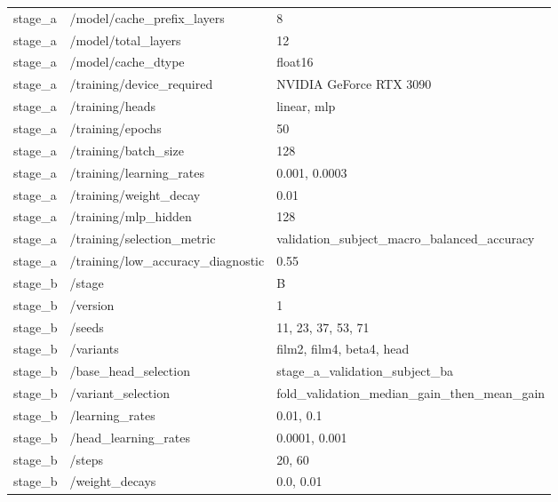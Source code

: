 \begin{longtable}{p{.65in}p{2.8in}p{3.2in}}
stage\_\allowbreak{}a & /model/cache\_\allowbreak{}prefix\_\allowbreak{}layers & 8 \\
stage\_\allowbreak{}a & /model/total\_\allowbreak{}layers & 12 \\
stage\_\allowbreak{}a & /model/cache\_\allowbreak{}dtype & float16 \\
stage\_\allowbreak{}a & /training/device\_\allowbreak{}required & NVIDIA GeForce RTX 3090 \\
stage\_\allowbreak{}a & /training/heads & linear, mlp \\
stage\_\allowbreak{}a & /training/epochs & 50 \\
stage\_\allowbreak{}a & /training/batch\_\allowbreak{}size & 128 \\
stage\_\allowbreak{}a & /training/learning\_\allowbreak{}rates & 0.001, 0.0003 \\
stage\_\allowbreak{}a & /training/weight\_\allowbreak{}decay & 0.01 \\
stage\_\allowbreak{}a & /training/mlp\_\allowbreak{}hidden & 128 \\
stage\_\allowbreak{}a & /training/selection\_\allowbreak{}metric & validation\_\allowbreak{}subject\_\allowbreak{}macro\_\allowbreak{}balanced\_\allowbreak{}accuracy \\
stage\_\allowbreak{}a & /training/low\_\allowbreak{}accuracy\_\allowbreak{}diagnostic & 0.55 \\
stage\_\allowbreak{}b & /stage & B \\
stage\_\allowbreak{}b & /version & 1 \\
stage\_\allowbreak{}b & /seeds & 11, 23, 37, 53, 71 \\
stage\_\allowbreak{}b & /variants & film2, film4, beta4, head \\
stage\_\allowbreak{}b & /base\_\allowbreak{}head\_\allowbreak{}selection & stage\_\allowbreak{}a\_\allowbreak{}validation\_\allowbreak{}subject\_\allowbreak{}ba \\
stage\_\allowbreak{}b & /variant\_\allowbreak{}selection & fold\_\allowbreak{}validation\_\allowbreak{}median\_\allowbreak{}gain\_\allowbreak{}then\_\allowbreak{}mean\_\allowbreak{}gain \\
stage\_\allowbreak{}b & /learning\_\allowbreak{}rates & 0.01, 0.1 \\
stage\_\allowbreak{}b & /head\_\allowbreak{}learning\_\allowbreak{}rates & 0.0001, 0.001 \\
stage\_\allowbreak{}b & /steps & 20, 60 \\
stage\_\allowbreak{}b & /weight\_\allowbreak{}decays & 0.0, 0.01 \\

\end{longtable}

